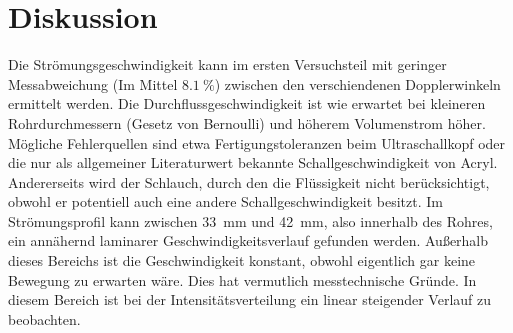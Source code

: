\section{Diskussion}
\label{sec:Diskussion}

Die Strömungsgeschwindigkeit kann im ersten Versuchsteil mit geringer Messabweichung (Im Mittel $\SI{8.1}{\percent}$) zwischen den verschiendenen Dopplerwinkeln ermittelt werden. Die Durchflussgeschwindigkeit ist wie erwartet bei kleineren Rohrdurchmessern (Gesetz von Bernoulli) und höherem Volumenstrom höher. Mögliche Fehlerquellen sind etwa Fertigungstoleranzen beim Ultraschallkopf oder die nur als allgemeiner Literaturwert bekannte Schallgeschwindigkeit von Acryl. Andererseits wird der Schlauch, durch den die Flüssigkeit nicht berücksichtigt, obwohl er potentiell auch eine andere Schallgeschwindigkeit besitzt.
Im Strömungsprofil kann zwischen \SI{33}{mm} und \SI{42}{mm}, also innerhalb des Rohres, ein annähernd laminarer Geschwindigkeitsverlauf gefunden werden. Außerhalb dieses Bereichs ist die Geschwindigkeit konstant, obwohl eigentlich gar keine Bewegung zu erwarten wäre. Dies hat vermutlich messtechnische Gründe. In diesem Bereich ist bei der Intensitätsverteilung ein linear steigender Verlauf zu beobachten.
